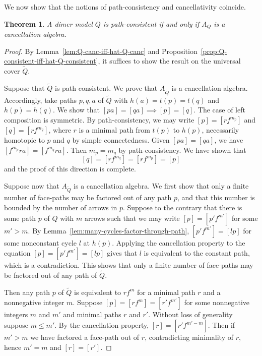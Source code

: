 \documentclass{article}
\newtheorem{thm}{Theorem}[section]
\theoremstyle{definition}
\begin{document}
We now show that the notions of path-consistency and cancellativity coincide.

\begin{thm}\label{thm:consistent-iff-cancellation}
	A dimer model $Q$ is path-consistent if and only if $A_Q$ is a cancellation algebra. 
\end{thm}
\begin{proof}
	By Lemma~\ref{lem:Q-canc-iff-hat-Q-canc} and Proposition~\ref{prop:Q-consistent-iff-hat-Q-consistent}, it suffices to show the result on the universal cover $\widetilde Q$.

	Suppose that $\widetilde Q$ is path-consistent. 
	We prove that $A_{\widetilde Q}$ is a cancellation algebra. Accordingly, take paths $p,q,a$ of ${\widetilde Q}$ with $h(a)=t(p)=t(q)$ and $h(p)=h(q)$. We show that $[pa]=[qa]\implies [p]=[q]$. The case of left composition is symmetric. By path-consistency, we may write $[p]=[rf^{m_p}]$ and $[q]=[rf^{m_q}]$, where $r$ is a minimal path from $t(p)$ to $h(p)$, necessarily homotopic to $p$ and $q$ by simple connectedness. Given $[pa]=[qa]$, we have $[f^{m_p}ra]=[f^{m_q}ra]$. Then $m_p=m_q$ by path-consistency. We have shown that
	\[[q]=[rf^{m_q}]=[rf^{m_p}]=[p]\]
	and the proof of this direction is complete.

        


	Suppose now that $A_{\widetilde Q}$ is a cancellation algebra. 
	We first show that only a finite number of face-paths may be factored out of any path $p$, and that this number is bounded by the number of arrows in $p$. Suppose to the contrary that there is some path $p$ of $Q$ with $m$ arrows such that we may write
		$[p]=[p'f^{m'}]$ for some $m'>m$. By Lemma~\ref{lem:many-cycles-factor-through-path}, $[p'f^{m'}]=[lp]$ for some nonconstant cycle $l$ at $h(p)$. 
	Applying the cancellation property to the equation $[p]=[p'f^{m'}]=[lp]$ gives that $l$ is equivalent to the constant path, which is a contradiction. This shows that only a finite number of face-paths may be factored out of any path of ${\widetilde Q}$.

	Then any path $p$ of ${\widetilde Q}$ is equivalent to $rf^m$ for a minimal path $r$ and a nonnegative integer $m$. Suppose $[p]=[rf^m]=[r'f^{m'}]$ for some nonnegative integers $m$ and $m'$ and minimal paths $r$ and $r'$. Without loss of generality suppose $m\leq m'$. By the cancellation property, $[r]=[r'f^{m'-m}]$. Then if $m'>m$ we have factored a face-path out of $r$, contradicting minimality of $r$, hence $m'=m$ and $[r]=[r']$. 


\end{proof}
\end{document}
